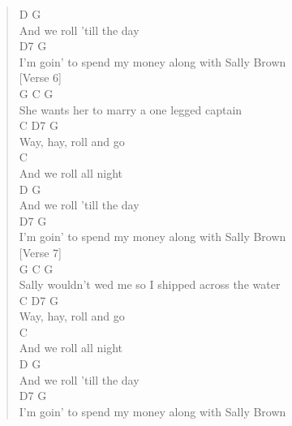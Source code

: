 \documentclass[11pt]{article}
\begin{document}
\begin{verse}
\hspace*{8em}D              G\\
And we roll 'till the day\\
\hspace*{41em}D7    G\\
I'm goin' to spend my money along with Sally Brown\\
\vspace*{1em}
\vspace*{1em}
[Verse 6]\\
\vspace*{1em}
G                         C            G\\
She wants her to marry a one legged captain\\
\hspace*{5em}C     D7      G\\
Way, hay, roll and go\\
\hspace*{18em}C\\
And we roll all night\\
\hspace*{8em}D              G\\
And we roll 'till the day\\
\hspace*{41em}D7    G\\
I'm goin' to spend my money along with Sally Brown\\
\vspace*{1em}
\vspace*{1em}
[Verse 7]\\
\vspace*{1em}
G                             C                G\\
Sally wouldn't wed me so I shipped across the water\\
\hspace*{5em}C     D7      G\\
Way, hay, roll and go\\
\hspace*{18em}C\\
And we roll all night\\
\hspace*{8em}D              G\\
And we roll 'till the day\\
\hspace*{41em}D7    G\\
I'm goin' to spend my money along with Sally Brown\\
\vspace*{1em}

\end{verse}
\end{document}
